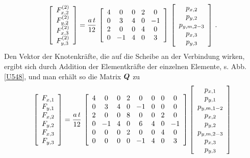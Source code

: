 \begin{align}
\left[\barr{c} F_{x,2}^{(2)} \\ F_{y,2}^{(2)} \\ F_{x,3}^{(2)} \\ F_{y,3}^{(2)}\earr \right]
= \frac{ a\,t}{12}\,\left[\barr{c @{\hspace{3mm}} c @{\hspace{3mm}} c @{\hspace{3mm}} c @{\hspace{3mm}} c} 4 & 0 & 0 &2 & 0 \\ 0 & 3 & 4 &0 & -1\\  2 & 0 & 0 &4 & 0 \\
 0 & -1 & 4 &0 & 3  \earr \right]\,\left[\barr{c} p_{x,2} \\ p_{y,2} \\ p_{y,m,2-3} \\ p_{x,3} \\ p_{y,3} \earr \right]\,.
\end{align}
Den Vektor der Knotenkr\"{a}fte, die auf die Scheibe an der Verbindung wirken, ergibt sich durch Addition der Elementkr\"{a}fte der einzelnen Elemente, s. Abb. \ref{U548}, und man erh\"{a}lt so die Matrix $\mbox{\boldmath $Q$} $ zu
\begin{align}
\left[\barr{c} F_{x,1} \\ F_{y,1} \\ F_{x,2} \\ F_{y,2} \\ F_{x,3} \\ F_{y,3}\earr \right] = \frac{a\,t}{12}\,\left[\barr{c @{\hspace{3mm}} c @{\hspace{3mm}} c @{\hspace{3mm}} c @{\hspace{3mm}} c @{\hspace{3mm}} c @{\hspace{3mm}} c @{\hspace{3mm}} c} 4 &0 &0 &2 &0 &0 &0 &0\\
0 &3 &4 &0 &-1 &0 &0 &0 \\
2 &0 &0 &8 &0 &0 &2 &0 \\ 0 &-1 &4 &0 &6 &4 &0 &-1 \\ 0 &0 & 0 &2 &0 &0 &4 &0 \\
0 & 0 &0 &0 &-1 &4 &0 &3\earr \right]
\left[\barr{c} p_{x,1} \\ p_{y,1} \\ p_{y,m,1-2} \\ p_{x,2} \\ p_{y,2} \\ p_{y,m,2-3} \\ p_{x,3} \\ p_{y,3}\earr \right]
\end{align}

